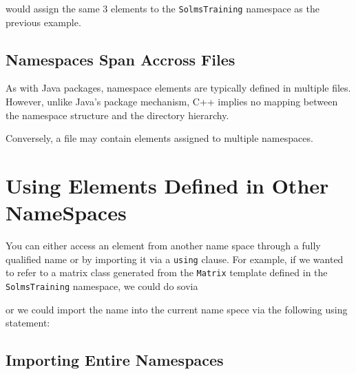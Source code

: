 would assign the same 3 elements to the \verb+SolmsTraining+ namespace
as the previous example.


\subsection{Namespaces Span Accross Files}

As with Java packages, namespace elements are typically defined in multiple
files. However, unlike Java's package mechanism, C++ implies no mapping 
between the namespace structure and the directory hierarchy. 

Conversely, a file may contain elements assigned to multiple namespaces.


\section{Using Elements Defined in Other NameSpaces}

You can either access an element from another name space through a fully
qualified name or by importing it via a \verb+using+ clause. For example,
if we wanted to refer to a matrix class generated from the \verb+Matrix+
template defined in the \verb+SolmsTraining+ namespace, we could do sovia


\noindent
or we could import the name into the current name spece via the following using
statement:



\subsection{Importing Entire Namespaces}

